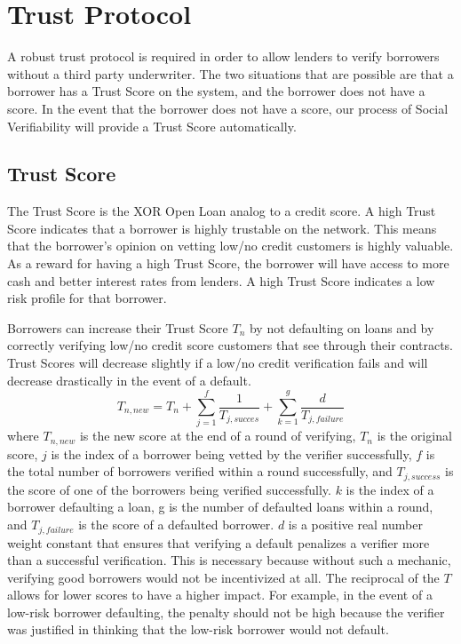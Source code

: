 \documentclass[twoside]{article}
\begin{document}
\section{Trust Protocol}
A robust trust protocol is required in order to allow lenders to verify borrowers without a third party underwriter. The two situations that are possible are that a borrower has a Trust Score on the system, and the borrower does not have a score. In the event that the borrower does not have a score, our process of Social Verifiability will provide a Trust Score automatically. 
\subsection{Trust Score}
The Trust Score is the XOR Open Loan analog to a credit score. A high Trust Score indicates that a borrower is highly trustable on the network. This means that the borrower's opinion on vetting low/no credit customers is highly valuable. As a reward for having a high Trust Score, the borrower will have access to more cash and better interest rates from lenders. A high Trust Score indicates a low risk profile for that borrower. 

Borrowers can increase their Trust Score $T_{n}$ by not defaulting on loans and by correctly verifying low/no credit score customers that see through their contracts. Trust Scores will decrease slightly if a low/no credit verification fails and will decrease drastically in the event of a default. 
\begin{equation}
T_{n,new} = T_{n} + \sum\limits_{j=1}^f  \frac{1}{T_{j,succes}} + \sum\limits_{k=1}^g  \frac{d}{T_{j,failure}}
\end{equation}
where $T_{n,new}$ is the new score at the end of a round of verifying, $T_{n}$ is the original score, $j$ is the index of a borrower being vetted by the verifier successfully, $f$ is the total number of borrowers verified within a round successfully, and $T_{j,success}$ is the score of one of the borrowers being verified successfully. $k$ is the index of a borrower defaulting a loan, g is the number of defaulted loans within a round, and $T_{j,failure}$ is the score of a defaulted borrower. $d$ is a positive real number weight constant that ensures that verifying a default penalizes a verifier more than a successful verification. This is necessary because without such a mechanic, verifying good borrowers would not be incentivized at all. The reciprocal of the $T$ allows for lower scores to have a higher impact. For example, in the event of a low-risk borrower defaulting, the penalty should not be high because the verifier was justified in thinking that the low-risk borrower would not default. 
\end{document}
